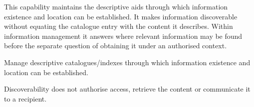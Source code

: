 This capability maintains the descriptive aids through which information existence and location can be established. It makes information discoverable without equating the catalogue entry with the content it describes. Within information management it answers where relevant information may be found before the separate question of obtaining it under an authorised context.



Manage descriptive catalogues/\allowbreak{}indexes through which information existence and location can be established.



Discoverability does not authorise access, retrieve the content or communicate it to a recipient.


